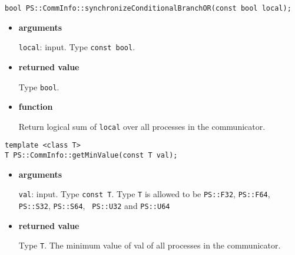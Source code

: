 
\begin{screen}
\begin{verbatim}
bool PS::CommInfo::synchronizeConditionalBranchOR(const bool local);
\end{verbatim}
\end{screen}

\begin{itemize}

\item{\bf arguments}

{\tt local}: input. Type {\tt const bool}.

\item{\bf returned value}

Type {\tt bool}.

\item{\bf function}

Return logical sum of {\tt local} over all processes in the communicator.




\end{itemize}


\begin{screen}
\begin{verbatim}
template <class T>
T PS::CommInfo::getMinValue(const T val);
\end{verbatim}
\end{screen}

\begin{itemize}

\item{\bf arguments}

{\tt val}: input. Type {\tt const T}. Type {\tt T} is allowed to be
{\tt PS::F32}, {\tt PS::F64}, {\tt PS::S32}, {\tt PS::S64}, {\tt
PS::U32} and {\tt PS::U64}

\item{\bf returned value}

Type {\tt T}. The minimum value of val of all processes in the communicator.





\end{itemize}

